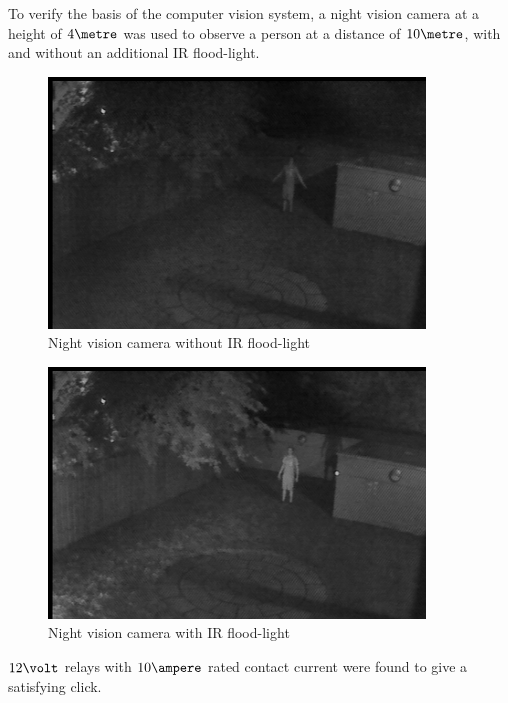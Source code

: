 \documentclass[12pt]{article} %
\begin{document}
\begin{appendices}
\clearpage
To verify the basis of the computer vision system, a night vision camera at a
height of $4\metre$ was used to observe a person at a distance of $10\metre$,
with and without an additional IR flood-light.

\begin{figure}[h]
    \centering
    \includegraphics[width=10cm]{pics/ir_no_flood.png}
    \caption{Night vision camera without IR flood-light}
\end{figure}

\begin{figure}[h]
    \centering
    \includegraphics[width=10cm]{pics/ir_flood.png}
    \caption{Night vision camera with IR flood-light}
\end{figure}

$12\volt$ relays with $10\ampere$ rated contact current were found to give a
satisfying click.

\end{appendices}
\end{document}
